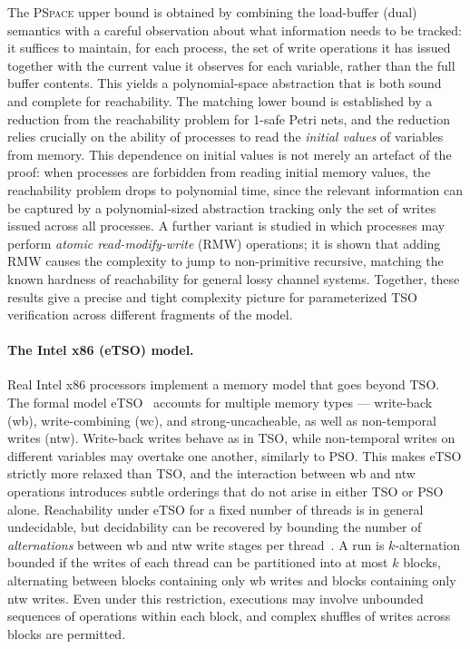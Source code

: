 The \textsc{PSpace} upper bound is obtained by combining the load-buffer
(dual) semantics with a careful observation about what information needs to be
tracked: it suffices to maintain, for each process, the set of write
operations it has issued together with the current value it observes for each
variable, rather than the full buffer contents. This yields a polynomial-space
abstraction that is both sound and complete for reachability. The matching
lower bound is established by a reduction from the reachability problem for
1-safe Petri nets, and the reduction relies crucially on the ability of
processes to read the \emph{initial values} of variables from memory. This
dependence on initial values is not merely an artefact of the proof: when
processes are forbidden from reading initial memory values, the reachability
problem drops to polynomial time, since the relevant information can be
captured by a polynomial-sized abstraction tracking only the set of writes
issued across all processes. A further variant is studied in which processes
may perform \emph{atomic read-modify-write} (RMW) operations; it is shown
that adding RMW causes the complexity to jump to non-primitive recursive,
matching the known hardness of reachability for general lossy channel systems.
Together, these results give a precise and tight complexity picture for
parameterized TSO verification across different fragments of the model.

\paragraph{The Intel x86 (eTSO) model.}
Real Intel x86 processors implement a memory model that goes beyond TSO. The
formal model eTSO~\cite{RMV22} accounts for multiple memory types ---
write-back (wb), write-combining (wc), and strong-uncacheable, as well as
non-temporal writes (ntw). Write-back writes behave as in TSO, while
non-temporal writes on different variables may overtake one another, similarly
to PSO. This makes eTSO strictly more relaxed than TSO, and the interaction
between wb and ntw operations introduces subtle orderings that do not arise in
either TSO or PSO alone. Reachability under eTSO for a fixed number of
threads is in general undecidable, but decidability can be recovered by
bounding the number of \emph{alternations} between wb and ntw write stages
per thread~\cite{AABKS24}. A run is $k$-alternation bounded if the writes of
each thread can be partitioned into at most $k$ blocks, alternating between
blocks containing only wb writes and blocks containing only ntw writes. Even
under this restriction, executions may involve unbounded sequences of
operations within each block, and complex shuffles of writes across blocks are
permitted.

